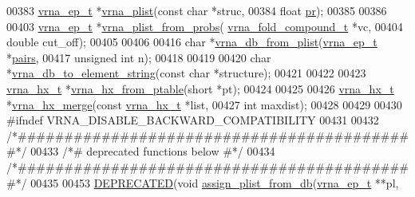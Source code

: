 \begin{DoxyCode}
00383 \mbox{\hyperlink{group__struct__utils_structvrna__elem__prob__s}{vrna\_ep\_t}} *\mbox{\hyperlink{group__struct__utils_gaf002d69024d709744664a8b9ca3dd77d}{vrna\_plist}}(\textcolor{keyword}{const} \textcolor{keywordtype}{char}  *struc,
00384                       \textcolor{keywordtype}{float}       \mbox{\hyperlink{fold__vars_8h_ac98ec419070aee6831b44e5c700f090f}{pr}});
00385 
00386 
00403 \mbox{\hyperlink{group__struct__utils_structvrna__elem__prob__s}{vrna\_ep\_t}} *\mbox{\hyperlink{group__pf__fold_ga94f6efc0b8d8712b023452794a0a5bd2}{vrna\_plist\_from\_probs}}(
      \mbox{\hyperlink{group__fold__compound_structvrna__fc__s}{vrna\_fold\_compound\_t}} *vc,
00404                                  \textcolor{keywordtype}{double}               cut\_off);
00405 
00406 
00416 \textcolor{keywordtype}{char} *\mbox{\hyperlink{group__struct__utils_ga6a51a36b9245d0bac868c5cd172b9611}{vrna\_db\_from\_plist}}(\mbox{\hyperlink{group__struct__utils_structvrna__elem__prob__s}{vrna\_ep\_t}}    *\mbox{\hyperlink{group__struct__utils_ga6341cbb704924824e0236c1dce791032}{pairs}},
00417                          \textcolor{keywordtype}{unsigned} \textcolor{keywordtype}{int} n);
00418 
00419 
00420 \textcolor{keywordtype}{char} *\mbox{\hyperlink{group__struct__utils_ga45360c09fb6d04d96e42dcccbb66015b}{vrna\_db\_to\_element\_string}}(\textcolor{keyword}{const} \textcolor{keywordtype}{char} *structure);
00421 
00422 
00423 \mbox{\hyperlink{group__struct__utils_structvrna__hx__s}{vrna\_hx\_t}} *\mbox{\hyperlink{group__struct__utils_ga7ca60670fbbf23ae2ac9f63e5dbf8aef}{vrna\_hx\_from\_ptable}}(\textcolor{keywordtype}{short} *pt);
00424 
00425 
00426 \mbox{\hyperlink{group__struct__utils_structvrna__hx__s}{vrna\_hx\_t}} *\mbox{\hyperlink{group__struct__utils_ga2fdaac8bb6c239c119ad5c20b145b7f2}{vrna\_hx\_merge}}(\textcolor{keyword}{const} \mbox{\hyperlink{group__struct__utils_structvrna__hx__s}{vrna\_hx\_t}}  *list,
00427                          \textcolor{keywordtype}{int}              maxdist);
00428 
00429 
00430 \textcolor{preprocessor}{#ifndef VRNA\_DISABLE\_BACKWARD\_COMPATIBILITY}
00431 
00432 \textcolor{comment}{/*###########################################*/}
00433 \textcolor{comment}{/*# deprecated functions below              #*/}
00434 \textcolor{comment}{/*###########################################*/}
00435 
00453 \mbox{\hyperlink{structure__utils_8h_aab347a3c03fbe8e7319551b9fa0cce4a}{DEPRECATED}}(\textcolor{keywordtype}{void} \mbox{\hyperlink{group__struct__utils_gab61df77cf7949cd516181fce0c3d7d78}{assign\_plist\_from\_db}}(\mbox{\hyperlink{group__struct__utils_structvrna__elem__prob__s}{vrna\_ep\_t}}  **pl,

\end{DoxyCode}
